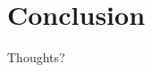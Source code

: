 \documentclass[12pt]{article}
\begin{document}




\section*{Conclusion}
Thoughts?



\end{document}
